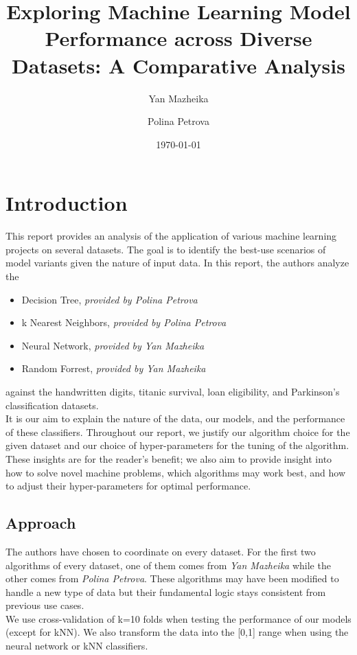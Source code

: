 \documentclass{article}
\title{Exploring Machine Learning Model Performance across Diverse Datasets: A Comparative Analysis}
\author{Yan Mazheika \and Polina Petrova}
\date{\today}
\begin{document}
\maketitle

\section*{Introduction}
This report provides an analysis of the application of various machine learning projects on several datasets.
The goal is to identify the best-use scenarios of model variants given the nature of input data.
In this report, the authors analyze the
\begin{itemize}
    \item Decision Tree, \textit{provided by Polina Petrova}
    \item k Nearest Neighbors, \textit{provided by Polina Petrova}
    \item Neural Network, \textit{provided by Yan Mazheika}
    \item Random Forrest, \textit{provided by Yan Mazheika}
\end{itemize}
against the handwritten digits, titanic survival, loan eligibility, and Parkinson's classification datasets.
\\

It is our aim to explain the nature of the data, our models, and the performance of these classifiers. Throughout our report,
we justify our algorithm choice for the given dataset and our choice of hyper-parameters for the tuning of the algorithm. These insights
are for the reader's benefit; we also aim to provide insight into how to solve novel machine problems, which algorithms may work best, and how
to adjust their hyper-parameters for optimal performance.

\subsection*{Approach}
The authors have chosen to coordinate on every dataset. For the first two algorithms of every dataset, one of them comes from \textit{Yan Mazheika}
while the other comes from \textit{Polina Petrova}. These algorithms may have been modified to handle a new type of data
but their fundamental logic stays consistent from previous use cases.
\\

We use cross-validation of k=10 folds when testing the performance of our models (except for kNN). We also transform the data into the [0,1] range when using the neural network or kNN classifiers.
\end{document}

